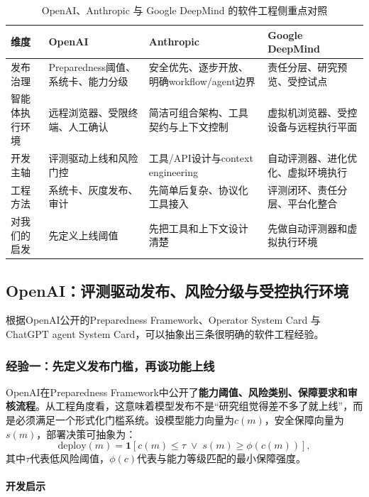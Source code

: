 \documentclass[12pt,a4paper]{article}
\begin{document}
\begin{table}[H]
\centering
\caption{OpenAI、Anthropic 与 Google DeepMind 的软件工程侧重点对照}
\begin{tabular}{p{2.6cm}p{3.2cm}p{3.2cm}p{3.2cm}}
\toprule
\textbf{维度} & \textbf{OpenAI} & \textbf{Anthropic} & \textbf{Google DeepMind} \\
\midrule
发布治理 & Preparedness阈值、系统卡、能力分级 & 安全优先、逐步开放、明确workflow/agent边界 & 责任分层、研究预览、受控试点 \\
智能体执行环境 & 远程浏览器、受限终端、人工确认 & 简洁可组合架构、工具契约与上下文控制 & 虚拟机浏览器、受控设备与远程执行平面 \\
开发主轴 & 评测驱动上线和风险门控 & 工具/API设计与context engineering & 自动评测器、进化优化、虚拟环境执行 \\
工程方法 & 系统卡、灰度发布、审计 & 先简单后复杂、协议化工具接入 & 评测闭环、责任分层、平台化整合 \\
对我们的启发 & 先定义上线阈值 & 先把工具和上下文设计清楚 & 先做自动评测器和虚拟执行环境 \\
\bottomrule
\end{tabular}
\end{table}

\subsection{OpenAI：评测驱动发布、风险分级与受控执行环境}

根据OpenAI公开的Preparedness Framework、Operator System Card 与 ChatGPT agent System Card，可以抽象出三条很明确的软件工程经验。

\subsubsection{经验一：先定义发布门槛，再谈功能上线}

OpenAI在Preparedness Framework中公开了\textbf{能力阈值、风险类别、保障要求和审核流程}。从工程角度看，这意味着模型发布不是“研究组觉得差不多了就上线”，而是必须满足一个形式化门槛系统。设模型能力向量为$c(m)$，安全保障向量为$s(m)$，部署决策可抽象为：
\begin{equation}
\text{deploy}(m) = \mathbf{1}\left[c(m) \leq \tau \;\lor\; s(m) \geq \phi(c(m))\right],
\end{equation}
其中$\tau$代表低风险阈值，$\phi(c)$代表与能力等级匹配的最小保障强度。

\paragraph{开发启示}
\end{document}
